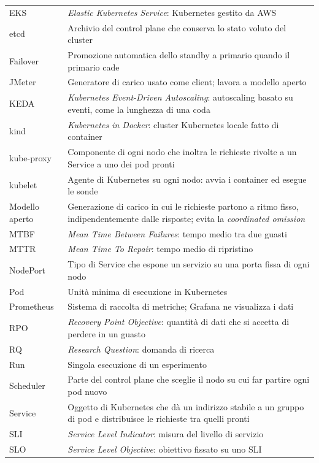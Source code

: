 \begin{longtable}{@{}lp{11.5cm}@{}}
EKS      & \textit{Elastic Kubernetes Service}: Kubernetes gestito da AWS \\
etcd     & Archivio del control plane che conserva lo stato voluto del cluster \\
Failover & Promozione automatica dello standby a primario quando il primario cade \\
JMeter   & Generatore di carico usato come client; lavora a modello aperto \\
KEDA     & \textit{Kubernetes Event-Driven Autoscaling}: autoscaling basato su eventi, come la lunghezza di una coda \\
kind     & \textit{Kubernetes in Docker}: cluster Kubernetes locale fatto di container \\
kube-proxy & Componente di ogni nodo che inoltra le richieste rivolte a un Service a uno dei pod pronti \\
kubelet  & Agente di Kubernetes su ogni nodo: avvia i container ed esegue le sonde \\
Modello aperto & Generazione di carico in cui le richieste partono a ritmo fisso, indipendentemente dalle risposte; evita la \textit{coordinated omission} \\
MTBF     & \textit{Mean Time Between Failures}: tempo medio tra due guasti \\
MTTR     & \textit{Mean Time To Repair}: tempo medio di ripristino \\
NodePort & Tipo di Service che espone un servizio su una porta fissa di ogni nodo \\
Pod      & Unità minima di esecuzione in Kubernetes \\
Prometheus & Sistema di raccolta di metriche; Grafana ne visualizza i dati \\
RPO      & \textit{Recovery Point Objective}: quantità di dati che si accetta di perdere in un guasto \\
RQ       & \textit{Research Question}: domanda di ricerca \\
Run      & Singola esecuzione di un esperimento \\
Scheduler & Parte del control plane che sceglie il nodo su cui far partire ogni pod nuovo \\
Service  & Oggetto di Kubernetes che dà un indirizzo stabile a un gruppo di pod e distribuisce le richieste tra quelli pronti \\
SLI      & \textit{Service Level Indicator}: misura del livello di servizio \\
SLO      & \textit{Service Level Objective}: obiettivo fissato su uno SLI \\

\end{longtable}
